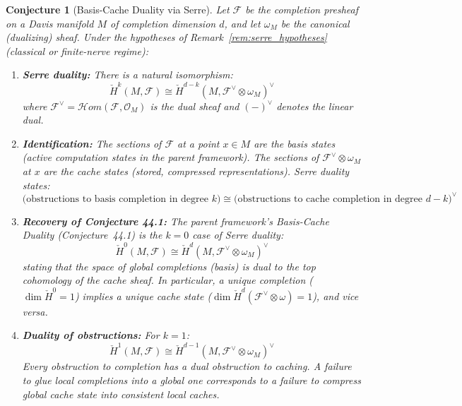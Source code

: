 \documentclass[11pt,letterpaper]{article}
\newtheorem{conjecture}{Conjecture}[section]
\newcommand{\Hcech}{\check{H}}
\newcommand{\sheaf}{\mathcal{F}}
\begin{document}
\begin{conjecture}[Basis-Cache Duality via 
Serre]\label{conj:serre}
Let $\sheaf$ be the completion presheaf on a Davis manifold $M$ of 
completion dimension $d$, and let $\omega_M$ be the canonical 
(dualizing) sheaf. Under the hypotheses of 
Remark~\ref{rem:serre_hypotheses} (classical or finite-nerve regime):

\begin{enumerate}[label=(\alph*)]
    \item \textbf{Serre duality:} There is a natural isomorphism:
    \begin{equation}\label{eq:serre}
        \Hcech^k(M, \sheaf) \cong 
        \Hcech^{d-k}(M, \sheaf^\vee \otimes \omega_M)^\vee
    \end{equation}
    where $\sheaf^\vee = \mathcal{H}om(\sheaf, \mathcal{O}_M)$ is the 
    dual sheaf and $(-)^\vee$ denotes the linear dual.
    
    \item \textbf{Identification:} The sections of $\sheaf$ at a point 
    $x \in M$ are the \emph{basis states} (active computation states in 
    the parent framework). The sections of $\sheaf^\vee \otimes 
    \omega_M$ at $x$ are the \emph{cache states} (stored, compressed 
    representations). Serre duality states:
    \begin{equation}\label{eq:basis_cache}
        \text{(obstructions to basis completion in degree } k\text{)} 
        \cong 
        \text{(obstructions to cache completion in degree } d-k
        \text{)}^\vee
    \end{equation}
    
    \item \textbf{Recovery of Conjecture 44.1:} The parent framework's 
    Basis-Cache Duality (Conjecture~44.1) is the $k=0$ case of Serre 
    duality:
    \begin{equation}\label{eq:bc_recovery}
        \Hcech^0(M, \sheaf) \cong 
        \Hcech^d(M, \sheaf^\vee \otimes \omega_M)^\vee
    \end{equation}
    stating that the space of global completions (basis) is dual to the 
    top cohomology of the cache sheaf. In particular, a unique 
    completion ($\dim \Hcech^0 = 1$) implies a unique cache state 
    ($\dim \Hcech^d(\sheaf^\vee \otimes \omega) = 1$), and vice versa.
    
    \item \textbf{Duality of obstructions:} For $k=1$:
    \begin{equation}\label{eq:obstruction_dual}
        \Hcech^1(M, \sheaf) \cong 
        \Hcech^{d-1}(M, \sheaf^\vee \otimes \omega_M)^\vee
    \end{equation}
    Every obstruction to completion has a \emph{dual obstruction} to 
    caching. A failure to glue local completions into a global one 
    corresponds to a failure to compress global cache state into 
    consistent local caches.
\end{enumerate}


\end{conjecture}
\end{document}
